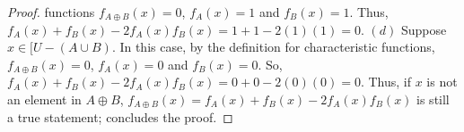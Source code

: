 \documentclass[a4paper, 12pt]{article}
\theoremstyle{plain}
\begin{document}
\begin{proof}
		\indent functions $f_{A \oplus B}(x) = 0$, $f_{A}(x) = 1$ and $f_{B}(x) = 1$. Thus, \newline 
		\indent $f_{A}(x) + f_{B}(x) - 2f_{A}(x)f_{B}(x) = 1 + 1 - 2(1)(1) = 0$.
		\newline \newline \indent $(d)$ Suppose $x \in [U - (A \cup B)$. In this case, by the definition 
		for \newline \indent characteristic functions, $f_{A \oplus B}(x) = 0$, $f_{A}(x) = 0$ and 
		$f_{B}(x) = 0$. So, \indent $f_{A}(x) + f_{B}(x) - 2f_{A}(x)f_{B}(x) = 0 + 0 - 2(0)(0) = 0$.
		\newline
		\newline
		Thus, if $x$ is not an element in $A \oplus B$, 
		$f_{A \oplus B}(x) = f_{A}(x) + f_{B}(x) - 2f_{A}(x)f_{B}(x)$ is still a true statement; 
		concludes the proof.
	\end{proof}
\end{document}
